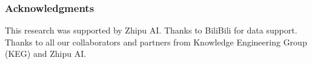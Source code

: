 \documentclass{article} %
\begin{document}



\subsubsection*{Acknowledgments}
This research was supported by Zhipu AI. Thanks to BiliBili for data support. Thanks to all our collaborators and partners from Knowledge Engineering Group (KEG) and Zhipu AI.





\clearpage
\appendix






\end{document}
